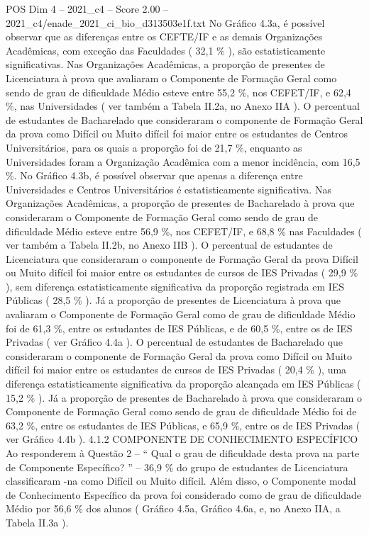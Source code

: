 \begin{textsample}{POS Dim 4 – 2021\_c4 – Score 2.00 – 2021\_c4/enade\_2021\_ci\_bio\_d313503e1f.txt}
No Gráfico 4.3a, é possível observar que as diferenças entre os CEFTE/IF e as demais Organizações Acadêmicas, com exceção das Faculdades ( 32,1 \% ), são estatisticamente significativas.
Nas Organizações Acadêmicas, a proporção de presentes de Licenciatura à prova que avaliaram o Componente de Formação Geral como sendo de grau de dificuldade Médio esteve entre 55,2 \%, nos CEFET/IF, e 62,4 \%, nas Universidades ( ver também a Tabela II.2a, no Anexo IIA ).
O percentual de estudantes de Bacharelado que consideraram o componente de Formação Geral da prova como Difícil ou Muito difícil foi maior entre os estudantes de Centros Universitários, para os quais a proporção foi de 21,7 \%, enquanto as Universidades foram a Organização Acadêmica com a menor incidência, com 16,5 \%.
No Gráfico 4.3b, é possível observar que apenas a diferença entre Universidades e Centros Universitários é estatisticamente significativa.
Nas Organizações Acadêmicas, a proporção de presentes de Bacharelado à prova que consideraram o Componente de Formação Geral como sendo de grau de dificuldade Médio esteve entre 56,9 \%, nos CEFET/IF, e 68,8 \% nas Faculdades ( ver também a Tabela II.2b, no Anexo IIB ).
O percentual de estudantes de Licenciatura que consideraram o componente de Formação Geral da prova Difícil ou Muito difícil foi maior entre os estudantes de cursos de IES Privadas ( 29,9 \% ), sem diferença estatisticamente significativa da proporção registrada em IES Públicas ( 28,5 \% ).
Já a proporção de presentes de Licenciatura à prova que avaliaram o Componente de Formação Geral como de grau de dificuldade Médio foi de 61,3 \%, entre os estudantes de IES Públicas, e de 60,5 \%, entre os de IES Privadas ( ver Gráfico 4.4a ).
O percentual de estudantes de Bacharelado que consideraram o componente de Formação Geral da prova como Difícil ou Muito difícil foi maior entre os estudantes de cursos de IES Privadas ( 20,4 \% ), uma diferença estatisticamente significativa da proporção alcançada em IES Públicas ( 15,2 \% ).
Já a proporção de presentes de Bacharelado à prova que consideraram o Componente de Formação Geral como sendo de grau de dificuldade Médio foi de 63,2 \%, entre os estudantes de IES Públicas, e 65,9 \%, entre os de IES Privadas ( ver Gráfico 4.4b ). 4.1.2 COMPONENTE DE CONHECIMENTO ESPECÍFICO Ao responderem à Questão 2 – “ Qual o grau de dificuldade desta prova na parte de Componente Específico? ” – 36,9 \% do grupo de estudantes de Licenciatura classificaram -na como Difícil ou Muito difícil.
Além disso, o Componente modal de Conhecimento Específico da prova foi considerado como de grau de dificuldade Médio por 56,6 \% dos alunos ( Gráfico 4.5a, Gráfico 4.6a, e, no Anexo IIA, a Tabela II.3a ).

\end{textsample}
